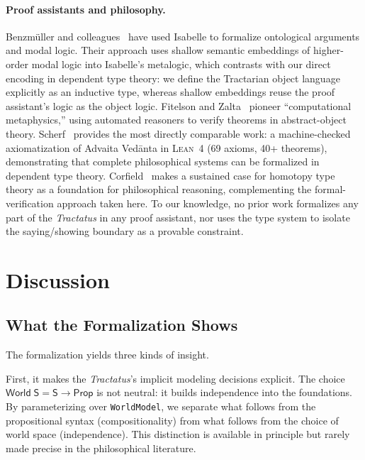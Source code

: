 \documentclass[10pt, letterpaper]{article}
\theoremstyle{definition}
\theoremstyle{remark}
\newcommand{\Sach}{\mathsf{S}}
\newcommand{\World}{\mathsf{World}}
\newcommand{\Prop}{\mathsf{Prop}}
\newcommand{\Lean}{\textsc{Lean}}
\begin{document}
\paragraph{Proof assistants and philosophy.}
Benzm\"uller and colleagues~\cite{benzmuller2017} have used
Isabelle to formalize ontological arguments and modal logic.
Their approach uses shallow semantic embeddings of higher-order
modal logic into Isabelle's metalogic, which contrasts with our
direct encoding in dependent type theory: we define the
Tractarian object language explicitly as an inductive type,
whereas shallow embeddings reuse the proof assistant's logic
as the object logic.
Fitelson and Zalta~\cite{fitelson2007} pioneer ``computational
metaphysics,'' using automated reasoners to verify theorems
in abstract-object theory.
Scherf~\cite{scherf2025} provides the most directly comparable
work: a machine-checked axiomatization of Advaita Ved\=anta in
\Lean~4 (69 axioms, 40+ theorems), demonstrating that complete
philosophical systems can be formalized in dependent type
theory.
Corfield~\cite{corfield2020} makes a sustained case for
homotopy type theory as a foundation for philosophical
reasoning, complementing the formal-verification approach
taken here.
To our knowledge, no prior work formalizes any part of the
\emph{Tractatus} in any proof assistant, nor uses the type
system to isolate the saying/showing boundary as a provable
constraint.

\section{Discussion}
\label{sec:discussion}

\subsection{What the Formalization Shows}
\label{sec:shows}

The formalization yields three kinds of insight.

First, it makes the \emph{Tractatus}'s implicit modeling
decisions explicit.  The choice $\World\;\Sach = \Sach \to
\Prop$ is not neutral: it builds independence into the
foundations.  By parameterizing over \texttt{WorldModel}, we
separate what follows from the propositional syntax (compositionality)
from what follows from the choice of world space (independence).
This distinction is available in principle but rarely made
precise in the philosophical literature.
\end{document}
